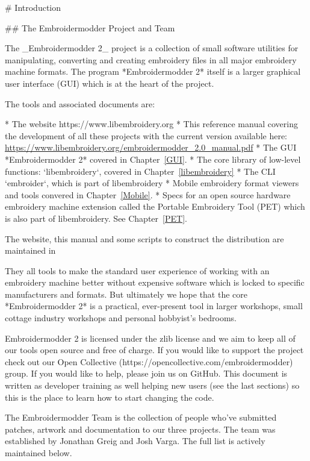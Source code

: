 \newpage

\vspace*{8cm}

# Introduction

## The Embroidermodder Project and Team

The _Embroidermodder 2_ project is a collection of small software
utilities for manipulating, converting and creating embroidery files in all
major embroidery machine formats. The program *Embroidermodder 2* itself
is a larger graphical user interface (GUI) which is at the heart of the project.

The tools and associated documents are:

* The website https://www.libembroidery.org
* This reference manual covering the development of all these projects with the current version available here: \url{https://www.libembroidery.org/embroidermodder_2.0_manual.pdf}
* The GUI *Embroidermodder 2* covered in Chapter~\ref{GUI}.
* The core library of low-level functions: `libembroidery`, covered in Chapter~\ref{libembroidery}
* The CLI `embroider`, which is part of libembroidery
* Mobile embroidery format viewers and tools convered in Chapter~\ref{Mobile}.
* Specs for an open source hardware embroidery machine extension called the Portable Embroidery Tool (PET) which is also part of libembroidery. See Chapter~\ref{PET}.

The website, this manual and some scripts to construct the distribution are
maintained in %

They all tools to make the standard
user experience of working with an embroidery machine better without expensive
software which is locked to specific manufacturers and formats. But ultimately
we hope that the core *Embroidermodder 2* is a practical, ever-present tool in
larger workshops, small cottage industry workshops and personal hobbyist's
bedrooms.

Embroidermodder 2 is licensed under the zlib license and we aim to keep all of our tools open
source and free of charge. If you would like to support the project check out our  Open
Collective (https://opencollective.com/embroidermodder) group.
If you would like to help,
please join us on GitHub. This document is written as developer training as well helping new
users (see the last sections) so this is the place to learn how to start changing the code.

The Embroidermodder Team is the collection of people who've submitted
patches, artwork and documentation to our three projects.
The team was established by Jonathan Greig and Josh Varga.
The full list is actively maintained below.

